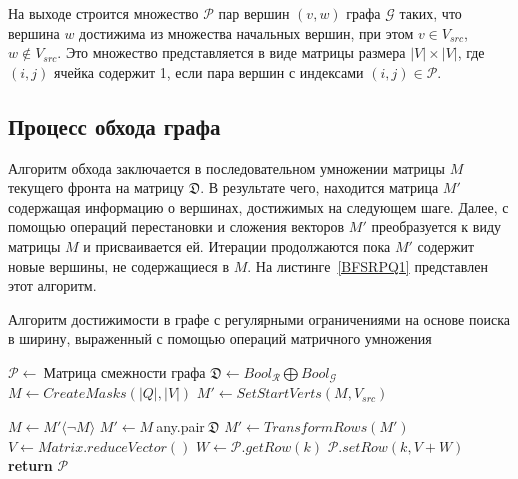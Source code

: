 На выходе строится множество $\mathcal{P}$ пар вершин $(v, w)$ графа $\mathcal{G}$ таких, что вершина $w$ достижима из множества начальных вершин, при этом $v \in V_{src}$, $w \not\in V_{src}$. Это множество представляется в виде матрицы размера $|V|\times|V|$, где $(i,j)$ ячейка содержит 1, если пара вершин с индексами $(i, j) \in \mathcal{P}$.

\subsection{Процесс обхода графа}

Алгоритм обхода заключается в последовательном умножении матрицы $M$ текущего фронта на матрицу $\mathfrak{D}$. В результате чего, находится матрица $M'$ содержащая информацию о вершинах, достижимых на следующем шаге. Далее, с помощью операций перестановки и сложения векторов $M'$ преобразуется к виду матрицы $M$ и присваивается ей. Итерации продолжаются пока $M'$ содержит новые вершины, не содержащиеся в $M$. На листинге~\ref{BFSRPQ1} представлен этот алгоритм.

\begin{algorithm}[t]
  \caption{Алгоритм достижимости в графе с регулярными ограничениями на основе поиска в ширину, выраженный с помощью операций матричного умножения}\label{BFSRPQ1}
  \begin{algorithmic}[1]
    \State $\mathcal{P}\gets~${Матрица смежности графа}
    \State $\mathfrak{D}\gets Bool_\mathcal{R} \bigoplus Bool_\mathcal{G}$
    \State $M\gets CreateMasks(|Q|,|V|)$ 
    \State $M'\gets SetStartVerts(M, V_{src})$  
    
      \State $M\gets M'\langle\neg M\rangle$
        \State $M'\gets M~$any.pair$~\mathfrak{D}$
        \State $M'\gets TransformRows(M')$\label{TransformRows}
      \EndFor
        \State $V\gets Matrix.reduceVector()$ 
            \State $W\gets\mathcal{P}.getRow(k)$
            \State $\mathcal{P}.setRow(k, V+W)$
      \EndFor
    \EndWhile
    \State \textbf{return} $\mathcal{P}$
    \EndProcedure
  \end{algorithmic}
\end{algorithm}

